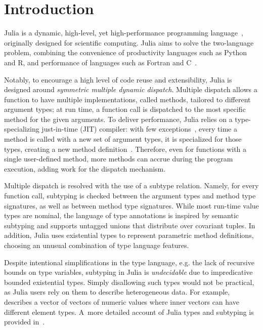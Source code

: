 \chapter{Introduction}

Julia is a dynamic, high-level, yet high-performance programming
language~\cite{TODO},
originally designed for scientific computing.
Julia aims to solve the two-language problem, combining the convenience of
productivity languages such as Python and R, and performance of languages such
as Fortran and C~\cite{TODO}.

Notably, to encourage a high level of code reuse and extensibility,
Julia is designed around \emph{symmetric multiple dynamic dispatch}.
Multiple dispatch allows a function to have multiple implementations, called
methods, tailored to different argument types; at run time, a function
call is dispatched to the most specific method for the given arguments.
To deliver performance, Julia relies on a type-specializing just-in-time (JIT)
compiler: with few exceptions~\cite{TODO},
every time a method is called with a new set of argument types,
it is specialized for those types, creating a new method definition~\cite{TODO}.
Therefore, even for functions with a single user-defined method,
more methods can accrue during the program execution,
adding work for the dispatch mechanism.


Multiple dispatch is resolved with the use of a subtype relation.
Namely, for every function call, subtyping is checked between
the argument types and method type signatures,
as well as between method type signatures.
While most run-time value types are nominal,
the language of type annotations is inspired by semantic subtyping
and supports untagged unions that distribute over covariant tuples.
In addition, Julia uses existential types
to represent parametric method definitions,
choosing an unusual combination of type language features.


Despite intentional simplifications in the type language,
e.g. the lack of recursive bounds on type variables,
subtyping in Julia is \emph{undecidable} due to %
impredicative bounded existential types.
Simply disallowing such types would not be practical,
as Julia users rely on them to describe heterogeneous data.
For example, 
describes a vector of vectors of numeric values where inner vectors
can have different element types.
A~more detailed account of Julia types and subtyping
is provided in~.

